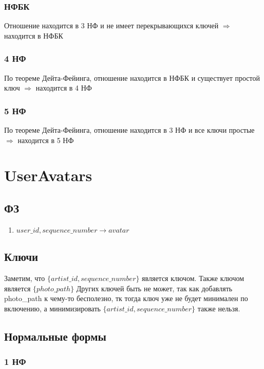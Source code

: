 \documentclass{article}
\begin{document}
\subsubsection{НФБК}

Отношение находится в 3 НФ и не имеет перекрывающихся ключей $\Rightarrow$ находится в НФБК

\subsubsection{4 НФ}

По теореме Дейта-Фейинга, отношение находится в НФБК и существует простой ключ $\Rightarrow$ находится в 4 НФ

\subsubsection{5 НФ}
По теореме Дейта-Фейинга, отношение находится в 3 НФ и все ключи простые $\Rightarrow$ находится в 5 НФ

\section{UserAvatars}

\subsection{ФЗ}
\begin{enumerate}
	\item $user\_id, sequence\_number \rightarrow avatar$
\end{enumerate}

\subsection{Ключи}

Заметим, что $\{artist\_id, sequence\_number\}$ является ключом. Также ключом является $\{photo\_path\}$ Других ключей быть не может, так как  добавлять photo\_path к чему-то бесполезно, тк тогда ключ уже не будет минимален по включению, а минимизировать $\{artist\_id, sequence\_number\}$ также нельзя.

\subsection{Нормальные формы}

\subsubsection{1 НФ}
\end{document}
